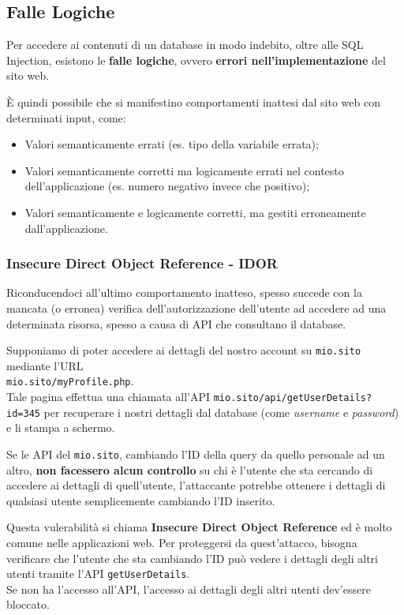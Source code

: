 \documentclass{article}
\begin{document}
\subsection{Falle Logiche}
Per accedere ai contenuti di un database in modo indebito, oltre alle SQL Injection, esistono le \textbf{falle logiche}, ovvero \textbf{errori nell'implementazione} del sito web.

È quindi possibile che si manifestino comportamenti inattesi dal sito web con determinati input, come:
\begin{itemize}
	\item Valori semanticamente errati (es. tipo della variabile errata);
	\item Valori semanticamente corretti ma logicamente errati nel contesto dell’applicazione (es. numero negativo invece che positivo);
	\item Valori semanticamente e logicamente corretti, ma gestiti erroneamente dall’applicazione.
\end{itemize} 
\newpage

\subsubsection{Insecure Direct Object Reference - IDOR}
Riconducendoci all'ultimo comportamento inatteso, spesso succede con la mancata (o erronea) verifica dell'autorizzazione dell'utente ad accedere ad una determinata risorsa, spesso a causa di API che consultano il database.

Supponiamo di poter accedere ai dettagli del nostro account su \verb|mio.sito| mediante l’URL \\\verb|mio.sito/myProfile.php|.\\
Tale pagina effettua una chiamata all’API \verb|mio.sito/api/getUserDetails?id=345| per recuperare i nostri dettagli dal database (come \textit{username} e \textit{password}) e li stampa a schermo.

Se le API del \verb|mio.sito|, cambiando l'ID della query da quello personale ad un altro, \textbf{non facessero alcun controllo} su chi è l’utente che sta cercando di accedere ai dettagli di quell’utente, l'attaccante potrebbe ottenere i dettagli di qualsiasi utente semplicemente cambiando l'ID inserito.

Questa vulerabilità si chiama \textbf{Insecure Direct Object Reference} ed è molto comune nelle applicazioni web.
Per proteggersi da quest'attacco, bisogna verificare che l'utente che sta cambiando l'ID può vedere i dettagli degli altri utenti tramite l'API \verb|getUserDetails|.\\
Se non ha l'accesso all'API, l'accesso ai dettagli degli altri utenti dev'essere bloccato.
\end{document}
